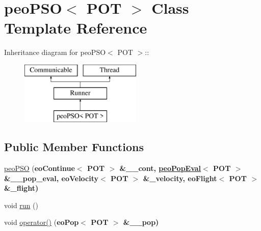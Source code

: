 \hypertarget{classpeoPSO}{
\section{peo\-PSO$<$ POT $>$ Class Template Reference}
\label{classpeoPSO}
}
Inheritance diagram for peo\-PSO$<$ POT $>$::\begin{figure}[H]
\begin{center}
\leavevmode
\includegraphics[height=3cm]{classpeoPSO}
\end{center}
\end{figure}
\subsection*{Public Member Functions}
\begin{CompactItemize}
\item 
\hypertarget{classpeoPSO_8a16249fb8a05ae64ceb72a25447df5b}{
\hyperlink{classpeoPSO_8a16249fb8a05ae64ceb72a25447df5b}{peo\-PSO} (\bf{eo\-Continue}$<$ POT $>$ \&\_\-\_\-cont, \hyperlink{classpeoPopEval}{peo\-Pop\-Eval}$<$ POT $>$ \&\_\-\_\-pop\_\-eval, \bf{eo\-Velocity}$<$ POT $>$ \&\_\-velocity, \bf{eo\-Flight}$<$ POT $>$ \&\_\-flight)}
\label{classpeoPSO_8a16249fb8a05ae64ceb72a25447df5b}

\item 
\hypertarget{classpeoPSO_d7336987d5f67c2eead90694fa06d0bf}{
void \hyperlink{classpeoPSO_d7336987d5f67c2eead90694fa06d0bf}{run} ()}
\label{classpeoPSO_d7336987d5f67c2eead90694fa06d0bf}

\item 
\hypertarget{classpeoPSO_8712f10f8572f9806bbc493018d593f7}{
void \hyperlink{classpeoPSO_8712f10f8572f9806bbc493018d593f7}{operator()} (\bf{eo\-Pop}$<$ POT $>$ \&\_\-\_\-pop)}
\label{classpeoPSO_8712f10f8572f9806bbc493018d593f7}

\end{CompactItemize}
